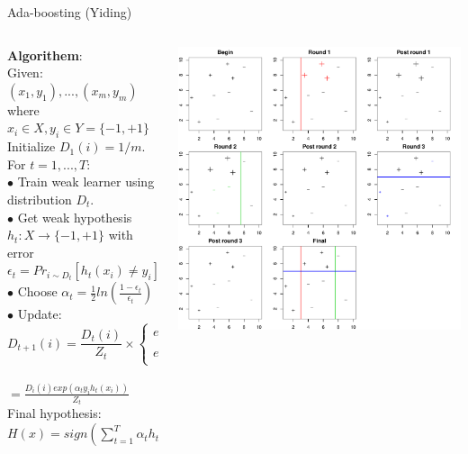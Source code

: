 \documentclass[table]{beamer}\usepackage[]{graphicx}\usepackage[]{color}
\makeatletter
\def\maxwidth{ %
  \ifdim\Gin@nat@width>\linewidth
    \linewidth
  \else
    \Gin@nat@width
  \fi
}
\newenvironment{knitrout}{}{} %
\makeatother
\begin{document}
\begin{frame}{Ada-boosting (Yiding)}
\begin{columns}[T]
\begin{column}[t]{5cm}
{\fontsize{0.2cm}{1em}\selectfont
\textbf{Algorithem}:\\
Given: $(x_1,y_1),...,(x_m,y_m)$ where $x_i \in X, y_i \in Y=\{-1,+1\}$ Initialize $D_1(i)=1/m$.\\
For $t=1,...,T$:\\
$\bullet$ Train weak learner using distribution $D_t$.\\
$\bullet$ Get weak hypothesis $h_t : X \rightarrow \{-1,+1\}$ with error $\epsilon_t=Pr_{i\sim D_t}\left[ h_t(x_i)\ne y_i \right]$\\
$\bullet$ Choose $\alpha_t=\frac{1}{2}ln\left(\frac{1-\epsilon_t}{\epsilon_t}\right)$\\
$\bullet$ Update:\\
$$
D_{t+1}(i)=\frac{D_t(i)}{Z_t}\times
\left\{ 
\begin{matrix}
e^{-\alpha_t} & \mbox{if $h_t(x_i)=y_i$}\\
e^{\alpha_t} & \mbox{if $h_t(x_i)\ne y_i$}
\end{matrix}
\right.
$$\\
$=\frac{D_i(i)exp(\alpha_t y_i h_t(x_i))}{Z_t}$ \\
Final hypothesis: $H(x)=sign\left(\sum_{t=1}^{T}\alpha_t h_t(x)\right)$

}
\end{column}

\begin{column}[t]{7cm}
\begin{knitrout}
\color{fgcolor}
\includegraphics[width=\maxwidth]{figure/unnamed-chunk-2} 

\end{knitrout}


\end{column}

\end{columns}
\end{frame}
\end{document}
